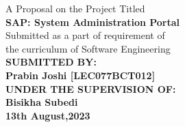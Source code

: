 \begin{center}
{\fontsize{12pt}{20}\selectfont A Proposal on the Project Titled}\\
\vspace{1in}
{\fontsize{14pt}{20}\selectfont \textbf{SAP: System Administration Portal}}\\
\vspace{1in}
Submitted as a part of requirement of \\the curriculum of
Software Engineering\\
\vspace{1in}
    {\fontsize{14pt}{20}\selectfont \textbf{\MakeUppercase{submitted by:}}}\\
    {\fontsize{14pt}{20}\selectfont \textbf{Prabin Joshi [LEC077BCT012]}}\\
\vspace{1in}
    {\fontsize{14pt}{20}\selectfont \textbf{\MakeUppercase{under the supervision of:}}}\\
    {\fontsize{14pt}{20}\selectfont \textbf{Bisikha Subedi}}\\
\vspace{1in}
{\fontsize{14pt}{20}\selectfont \textbf{13th August,2023}}\\
\end{center}
\thispagestyle{empty}
\newpage